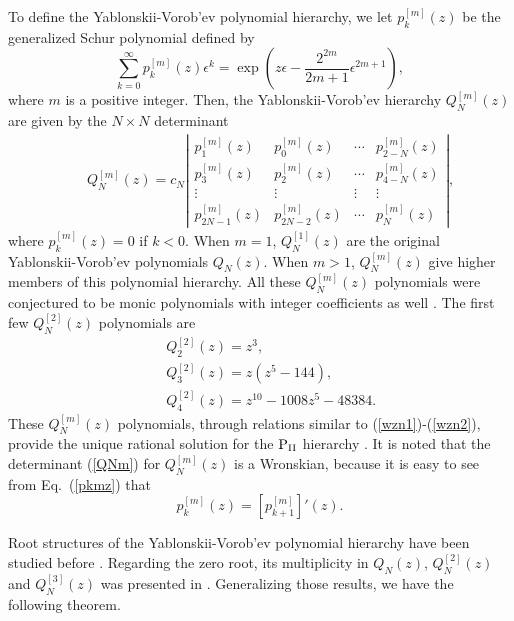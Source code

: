 \documentclass[amsmath,amssymb]{revtex4}
\def\[{\begin{equation}}
\def\]{\end{equation}}
\begin{document}
To define the Yablonskii-Vorob'ev polynomial hierarchy, we let $p_{k}^{[m]}(z)$ be the generalized Schur polynomial defined by
\begin{equation} \label{pkmz}
\sum_{k=0}^{\infty}p_k^{[m]}(z) \epsilon^k =\exp\left( z \epsilon - \frac{2^{2m}}{2m+1}\epsilon^{2m+1} \right),
\end{equation}
where $m$ is a positive integer. Then, the Yablonskii-Vorob'ev hierarchy $Q_{N}^{[m]}(z)$ are given by the $N \times N$ determinant \cite{Clarkson2003-II}
\begin{eqnarray} \label{QNm}
&& Q_{N}^{[m]}(z) = c_{N} \left| \begin{array}{cccc}
         p^{[m]}_{1}(z) & p^{[m]}_{0}(z) & \cdots &  p^{[m]}_{2-N}(z) \\
         p^{[m]}_{3}(z) & p^{[m]}_{2}(z) & \cdots &  p^{[m]}_{4-N}(z) \\
        \vdots& \vdots & \vdots & \vdots \\
         p^{[m]}_{2N-1}(z) & p^{[m]}_{2N-2}(z) & \cdots &  p^{[m]}_{N}(z)
       \end{array}
 \right|,
\end{eqnarray}
where $p_{k}^{[m]}(z)= 0$ if $k<0$. When $m=1$, $Q_{N}^{[1]}(z)$ are the original Yablonskii-Vorob'ev polynomials $Q_{N}(z)$. When $m>1$, $Q_{N}^{[m]}(z)$ give higher members of this polynomial hierarchy. All these $Q_{N}^{[m]}(z)$ polynomials were conjectured to be monic polynomials with integer coefficients as well \cite{Clarkson2003-II}. The first few $Q_{N}^{[2]}(z)$ polynomials are
\begin{eqnarray*}
&& Q_2^{[2]}(z)=z^3, \\
&& Q_3^{[2]}(z)=z(z^5-144),  \\
&& Q_4^{[2]}(z)=z^{10} - 1008 z^5-48384.
\end{eqnarray*}
These $Q_{N}^{[m]}(z)$ polynomials, through relations similar to (\ref{wzn1})-(\ref{wzn2}), provide the unique rational solution for the $\mbox{P}_{\mbox{\scriptsize II}}$ hierarchy \cite{Clarkson2003-II,Bertola2016}.
It is noted that the determinant (\ref{QNm}) for $Q_{N}^{[m]}(z)$ is a Wronskian, because it is easy to see from Eq.~(\ref{pkmz}) that
\[  \label{pkpkp1}
p_k^{[m]}(z)=[p_{k+1}^{[m]}]'(z).
\]

Root structures of the Yablonskii-Vorob'ev polynomial hierarchy have been studied before \cite{Fukutani,Taneda,Clarkson2003-II,Miller2014,Bertola2016}. Regarding the zero root, its multiplicity in $Q_{N}(z)$, $Q_{N}^{[2]}(z)$ and $Q_{N}^{[3]}(z)$ was presented in \cite{Taneda,Clarkson2003-II}. Generalizing those results, we have the following theorem.
\end{document}
